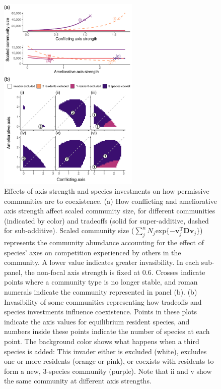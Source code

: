 \documentclass[12pt]{article}
\begin{document}
\begin{figure}[ht!]
\centering
\includegraphics[width=0.6\textwidth,keepaspectratio]{3-comm.pdf}
\caption{Effects of axis strength and species investments on 
how permissive communities are to coexistence.
(a) How conflicting and ameliorative axis strength affect scaled community size,
for different communities (indicated by color) and tradeoffs
(solid for super-additive, dashed for sub-additive).
Scaled community size
($\sum_j^n{N_j \text{exp} \{ -\mathbf{v}_{j}^{\text{T}} \mathbf{D} \mathbf{v}_j \}}$)
represents the community abundance accounting
for the effect of species' axes on competition experienced by others in the
community. 
A lower value indicates greater invasibility.
In each sub-panel, the non-focal axis strength is fixed at 0.6.
Crosses indicate points where a community type is no longer stable,
and roman numerals indicate the community represented in panel (b).
(b) Invasibility of some communities representing how tradeoffs and species
investments influence coexistence.
Points in these plots indicate the axis values for equilibrium resident species, and 
numbers inside these points indicate the number of species at each point.
The background color shows what happens when a third species is added:
This invader either is excluded (white), 
excludes one or more residents (orange or pink), or 
coexists with residents to form a new, 3-species community (purple).
Note that ii and v show the same community at different axis strengths.
}
\label{fig:comms-d}
\end{figure}
\end{document}
